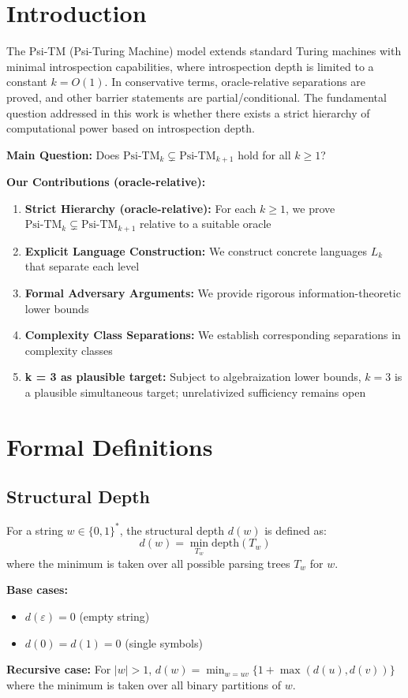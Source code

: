 
\section{Introduction}

The Psi-TM (Psi-Turing Machine) model extends standard Turing machines with minimal introspection capabilities, where introspection depth is limited to a constant $k = O(1)$. In conservative terms, oracle-relative separations are proved, and other barrier statements are partial/conditional. The fundamental question addressed in this work is whether there exists a strict hierarchy of computational power based on introspection depth.

\textbf{Main Question:} Does $\text{Psi-TM}_k \subsetneq \text{Psi-TM}_{k+1}$ hold for all $k \geq 1$?

\textbf{Our Contributions (oracle-relative):}
\begin{enumerate}
\item \textbf{Strict Hierarchy (oracle-relative):} For each $k \geq 1$, we prove $\text{Psi-TM}_k \subsetneq \text{Psi-TM}_{k+1}$ relative to a suitable oracle
\item \textbf{Explicit Language Construction:} We construct concrete languages $L_k$ that separate each level
\item \textbf{Formal Adversary Arguments:} We provide rigorous information-theoretic lower bounds
\item \textbf{Complexity Class Separations:} We establish corresponding separations in complexity classes
\item \textbf{k = 3 as plausible target:} Subject to algebraization lower bounds, $k=3$ is a plausible simultaneous target; unrelativized sufficiency remains open
\end{enumerate}

\section{Formal Definitions}

\subsection{Structural Depth}

\begin{definition}
For a string $w \in \{0,1\}^*$, the structural depth $d(w)$ is defined as:
$$d(w) = \min_{T_w} \text{depth}(T_w)$$
where the minimum is taken over all possible parsing trees $T_w$ for $w$.

\textbf{Base cases:}
\begin{itemize}
\item $d(\varepsilon) = 0$ (empty string)
\item $d(0) = d(1) = 0$ (single symbols)
\end{itemize}

\textbf{Recursive case:}
For $|w| > 1$, $d(w) = \min_{w=uv} \{1 + \max(d(u), d(v))\}$ where the minimum is taken over all binary partitions of $w$.
\end{definition}

